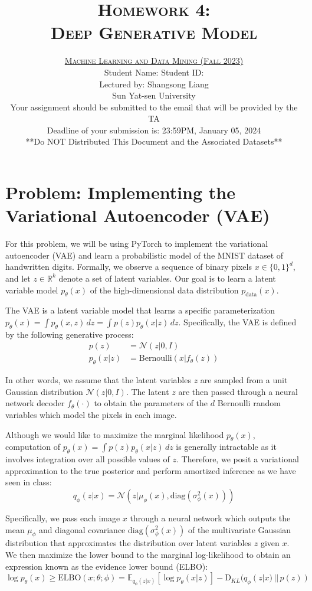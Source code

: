\documentclass[a4paper]{article}
\title{\textsc{Homework 4: \\  Deep Generative Model}} %
\author{\href{xx}{\textsc{Machine Learning and Data Mining (Fall 2023)}} \\[0.5em] 
Student Name: \hspace{13em} Student ID: \\[0.5em]
Lectured by: Shangsong Liang \\
Sun Yat-sen University\\
Your assignment should be submitted to the email that will be provided by the TA \\
Deadline of your submission is: 23:59PM, January 05, 2024\\
**Do NOT Distributed This Document and the Associated Datasets**}
\date{}
\theoremstyle{definition}
\begin{document}
\maketitle 
\section*{Problem: Implementing the Variational Autoencoder (VAE)}
For this problem, we will be using PyTorch to implement the variational autoencoder (VAE) and learn a probabilistic model of the MNIST dataset of handwritten digits. Formally, we observe a sequence of binary pixels $x \in \{0, 1\}^d$, and let $z \in \mathbb{R}^k$ denote a set of latent variables. Our goal is to learn a latent variable model $p_\theta(x)$ of the high-dimensional data distribution $p_{\text{data}}(x)$.

The VAE is a latent variable model that learns a specific parameterization $p_\theta(x) = \int p_\theta(x, z) \, dz = \int p(z)p_\theta(x|z) \, dz$. Specifically, the VAE is defined by the following generative process:
\begin{align*}
    p(z) &= \mathcal{N}(z|0, I) \\
    p_\theta(x|z) &= \text{Bernoulli}(x|f_\theta(z))
\end{align*}

In other words, we assume that the latent variables $z$ are sampled from a unit Gaussian distribution $\mathcal{N}(z|0, I)$. The latent $z$ are then passed through a neural network decoder $f_\theta(\cdot)$ to obtain the parameters of the $d$ Bernoulli random variables which model the pixels in each image.

Although we would like to maximize the marginal likelihood $p_\theta(x)$, computation of $p_\theta(x) = \int p(z)p_\theta(x|z) \, dz$ is generally intractable as it involves integration over all possible values of $z$. Therefore, we posit a variational approximation to the true posterior and perform amortized inference as we have seen in class:
\[
q_\phi(z|x) = \mathcal{N}(z|\mu_\phi(x), \text{diag}(\sigma_\phi^2(x)))
\]

Specifically, we pass each image $x$ through a neural network which outputs the mean $\mu_\phi$ and diagonal covariance $\text{diag}(\sigma_\phi^2(x))$ of the multivariate Gaussian distribution that approximates the distribution over latent variables $z$ given $x$. We then maximize the lower bound to the marginal log-likelihood to obtain an expression known as the evidence lower bound (ELBO):
\[
\log p_\theta(x) \geq \text{ELBO}(x; \theta; \phi) = \mathbb{E}_{q_\phi(z|x)}[\log p_\theta(x|z)] - \text{D}_{KL}(q_\phi(z|x) \,||\, p(z))
\]
\end{document}
